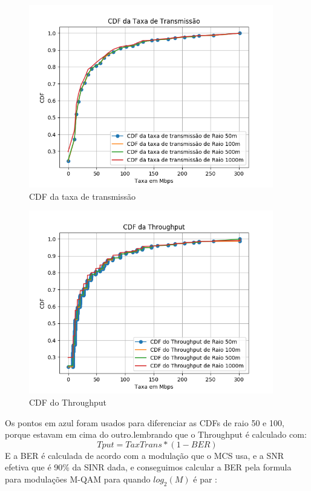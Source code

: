 \documentclass[12pt]{article}
\begin{document}
\FloatBarrier
\begin{figure}[h!]
\includegraphics[width=0.95\textwidth]{CDF_Taxa_de_transmissao.png}
    \caption{CDF da taxa de transmissão}
    \label{fig:my_label}
\end{figure}
\FloatBarrier
\begin{figure}[h!]
\includegraphics[width=0.95\textwidth]{CDF_Throughput.png}
    \caption{CDF do Throughput}
    \label{fig:my_label}
\end{figure}
\FloatBarrier
Os pontos em azul foram usados para diferenciar as CDFs de raio 50 e 100, porque estavam em cima do outro.lembrando que o Throughput é calculado com:
\begin{equation}
    Tput=TaxTrans*(1-BER)
\end{equation}
E a BER é calculada de acordo com a modulação que o MCS usa, e a SNR efetiva que é 90\% da SINR dada, e conseguimos calcular a BER pela formula para modulações M-QAM para quando $log_{2}(M)$ é par \cite{Lathi:2009:MDA:541365}:
\end{document}
